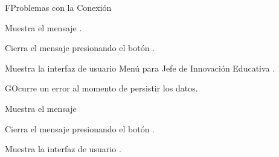 


\begin{UCtrayectoriaA}{F}{Problemas con la Conexión}

    \UCpaso Muestra el mensaje .

    \UCpaso[\UCactor] Cierra el mensaje presionando el botón .

\UCpaso Muestra la interfaz de usuario Menú para Jefe de Innovación Educativa .

\end{UCtrayectoriaA}




\begin{UCtrayectoriaA}{G}{Ocurre un error al momento de persistir los datos.}

    \UCpaso Muestra el mensaje 

    \UCpaso[\UCactor] Cierra el mensaje presionando el botón .

    \UCpaso Muestra la interfaz de usuario .

\end{UCtrayectoriaA}